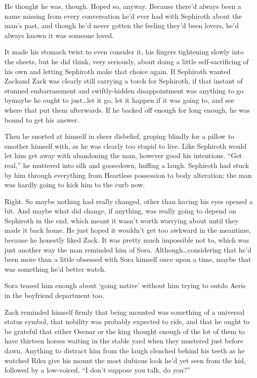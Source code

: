 He thought he was, though. Hoped so, anyway. Because there'd always been a name missing from every conversation he'd ever had with Sephiroth about the man's past, and though he'd never gotten the feeling they'd been lovers, he'd always known it was someone loved.

It made his stomach twist to even consider it, his fingers tightening slowly into the sheets, but he did think, very seriously, about doing a little self-sacrificing of his own and letting Sephiroth make that choice again. If Sephiroth wanted Zack\textemdash and Zack was clearly still carrying a torch for Sephiroth, if that instant of stunned embarrassment and swiftly-hidden disappointment was anything to go by\textemdash maybe he ought to just\ldots let it go, let it happen if it was going to, and see where that put them afterwards. If he backed off enough for long enough, he was bound to get his answer.

Then he snorted at himself in sheer disbelief, groping blindly for a pillow to smother himself with, as he was clearly too stupid to live. Like Sephiroth would let him get away with abandoning the man, however good his intentions. ``Get real,'' he muttered into silk and goosedown, huffing a laugh. Sephiroth had stuck by him through everything from Heartless possession to body alteration; the man was hardly going to kick him to the curb now.
\begin{sloppypar}
Right. So maybe nothing had really changed, other than having his eyes opened a bit. And maybe what did change, if anything, was really going to depend on Sephiroth in the end, which meant it wasn't worth worrying about until they made it back home. He just hoped it wouldn't get too awkward in the meantime, because he honestly liked Zack. It was pretty much impossible not to, which was just another way the man reminded him of Sora. Although\ldots considering that he'd been more than a little obsessed with Sora himself once upon a time, maybe that was something he'd better watch.
\end{sloppypar}
Sora teased him enough about `going native' without him trying to outdo Aeris in the boyfriend department too.


\scenechange


Zack reminded himself firmly that being mounted was something of a universal status symbol, that nobility was probably expected to ride, and that he ought to be grateful that either Osenar or the king thought enough of the lot of them to have thirteen horses waiting in the stable yard when they mustered just before dawn. Anything to distract him from the laugh clenched behind his teeth as he watched Riku give his mount the most dubious look he'd yet seen from the kid, followed by a low-voiced, ``I don't suppose you talk, do you?''

